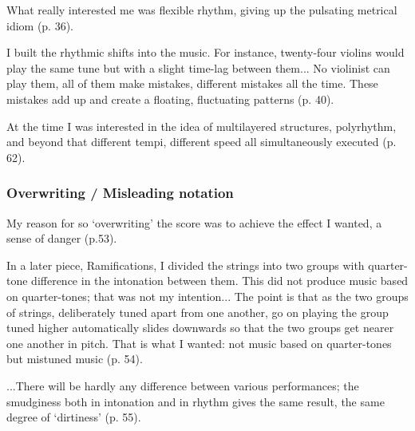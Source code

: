 \documentclass[a4paper,11pt]{article}
\newenvironment{MyShadequote}[1][]
    {\begin{mdframed}[style=MyShadeQuoteStyle,#1]}
    {\end{mdframed}}
\begin{document}
\begin{MyShadequote}
  What really interested me was flexible rhythm, giving up the pulsating metrical idiom (p. 36).
\end{MyShadequote}

\begin{MyShadequote}
  I built the rhythmic shifts into the music.
  For instance, twenty-four violins would play the same tune but with a slight time-lag between them...
  No violinist can play them, all of them make mistakes, different mistakes all the time.
  These mistakes add up and create a floating, fluctuating patterns (p. 40).
\end{MyShadequote}

\begin{MyShadequote}
  At the time I was interested in the idea of multilayered structures, polyrhythm, and beyond that different tempi, different speed all simultaneously executed (p. 62).
\end{MyShadequote}

\subsubsection{Overwriting / Misleading notation}
\label{subs:ligeti:overwriting}

\begin{MyShadequote}
  My reason for so `overwriting' the score was to achieve the effect I wanted, a sense of danger (p.53).
\end{MyShadequote}

\begin{MyShadequote}
  In a later piece, Ramifications, I divided the strings into two groups with quarter-tone difference in the intonation between them.
  This did not produce music based on quarter-tones; that was not my intention...
  The point is that as the two groups of strings, deliberately tuned apart from one another, go on playing the group tuned higher automatically slides downwards so that the two groups get nearer one another in pitch.
  That is what I wanted: not music based on quarter-tones but mistuned music (p. 54).
\end{MyShadequote}

\begin{MyShadequote}
  ...There will be hardly any difference between various performances; the smudginess both in intonation and in rhythm gives the same result, the same degree of ‘dirtiness’ (p. 55).
\end{MyShadequote}
\end{document}
